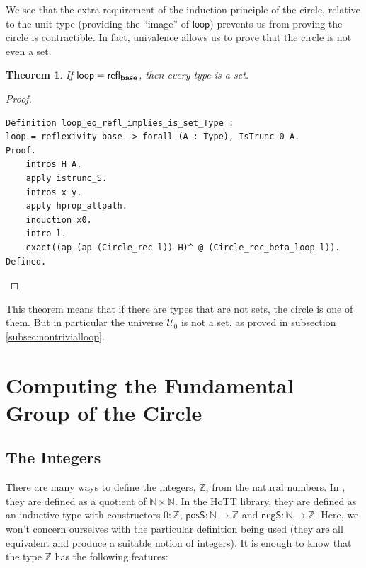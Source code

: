\documentclass[12 pt]{amsart}
\newtheorem{theorem}[subsubsection]{Theorem}
\theoremstyle{definition}
\theoremstyle{remark}
\newcommand{\Type}{\mathcal{U}}
\newcommand{\base}{\mathsf{\bf base}}
\newcommand{\lo}{\mathsf{ loop}}
\newcommand{\refl}{\mathsf{refl}}
\newcommand{\nat}{{\mathbb{N}}}
\newcommand{\intg}{{\mathbb{Z}}}
\newcommand{\posS}{\mathsf{posS}}
\newcommand{\negS}{\mathsf{negS}}
\begin{document}
We see that the extra requirement of the induction principle of the circle, relative to the unit type (providing the ``image'' of $\lo$) prevents us from proving the circle is contractible. In fact, univalence allows us to prove that the circle is not even a set.

\begin{theorem}
If $\lo = \refl_\base$, then every type is a set.
\end{theorem}

\begin{proof}
\begin{lstlisting}
Definition loop_eq_refl_implies_is_set_Type : 
loop = reflexivity base -> forall (A : Type), IsTrunc 0 A.
Proof.
    intros H A.
    apply istrunc_S.
    intros x y.
    apply hprop_allpath.
    induction x0.
    intro l.
    exact((ap (ap (Circle_rec l)) H)^ @ (Circle_rec_beta_loop l)).
Defined.
\end{lstlisting}
\end{proof}

This theorem means that if there are types that are not sets, the circle is one of them. But in particular the universe $\Type_0$ is not a set, as proved in subsection \ref{subsec:nontrivialloop}.

\section{Computing the Fundamental Group of the Circle}

\subsection{The Integers}
There are many ways to define the integers, $\intg$, from the natural numbers. In \cite[Section 6.10]{hottbook}, they are defined as a quotient of $\nat\times\nat$. In the HoTT library, they are defined as an inductive type with constructors $0 : \intg$, $\posS : \nat \to \intg$ and $\negS : \nat \to \intg$. Here, we won't concern ourselves with the particular definition being used (they are all equivalent and produce a suitable notion of integers). It is enough to know that the type $\intg$ has the following features:
\end{document}
